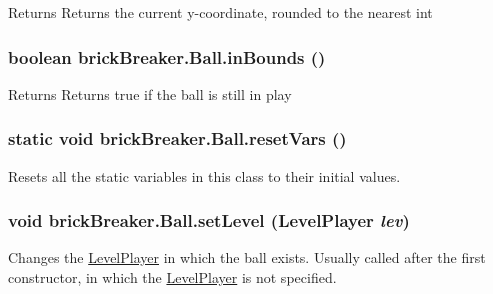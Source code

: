 \label{classbrick_breaker_1_1_ball_abc92d446c039bfae85f89ba82facdfc3}
\begin{DoxyReturn}{Returns}
Returns the current y-\/coordinate, rounded to the nearest int 
\end{DoxyReturn}
\hypertarget{classbrick_breaker_1_1_ball_ac516403ca5285c41619248f6c1e0690b}{
\subsubsection[{inBounds}]{\setlength{\rightskip}{0pt plus 5cm}boolean brickBreaker.Ball.inBounds ()}}
\label{classbrick_breaker_1_1_ball_ac516403ca5285c41619248f6c1e0690b}
\begin{DoxyReturn}{Returns}
Returns true if the ball is still in play 
\end{DoxyReturn}
\hypertarget{classbrick_breaker_1_1_ball_ad43ce78383f0415e608cb247e5df9ecd}{
\subsubsection[{resetVars}]{\setlength{\rightskip}{0pt plus 5cm}static void brickBreaker.Ball.resetVars ()}}
\label{classbrick_breaker_1_1_ball_ad43ce78383f0415e608cb247e5df9ecd}
Resets all the static variables in this class to their initial values. \hypertarget{classbrick_breaker_1_1_ball_a3a95a5d7eeab58dbacd89d1e304bf2d4}{
\subsubsection[{setLevel}]{\setlength{\rightskip}{0pt plus 5cm}void brickBreaker.Ball.setLevel ({\bf LevelPlayer} {\em lev})}}
\label{classbrick_breaker_1_1_ball_a3a95a5d7eeab58dbacd89d1e304bf2d4}
Changes the \hyperlink{classbrick_breaker_1_1_level_player}{LevelPlayer} in which the ball exists. Usually called after the first constructor, in which the \hyperlink{classbrick_breaker_1_1_level_player}{LevelPlayer} is not specified.


